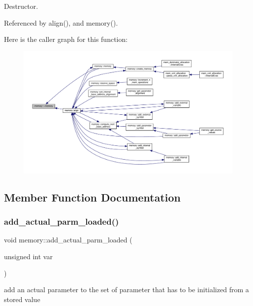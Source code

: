 Destructor. 



Referenced by align(), and memory().

Here is the caller graph for this function\+:
\nopagebreak
\begin{figure}[H]
\begin{center}
\leavevmode
\includegraphics[width=350pt]{d8/d99/classmemory_ae5893b724ce22f38b776558384f21680_icgraph}
\end{center}
\end{figure}


\subsection{Member Function Documentation}
\mbox{\label{classmemory_a3df806662ba923a3bf6d8608acae5048}} 
\subsubsection{\texorpdfstring{add\+\_\+actual\+\_\+parm\+\_\+loaded()}{add\_actual\_parm\_loaded()}}
{\footnotesize\ttfamily void memory\+::add\+\_\+actual\+\_\+parm\+\_\+loaded (\begin{DoxyParamCaption}\item[{unsigned int}]{var }\end{DoxyParamCaption})}



add an actual parameter to the set of parameter that has to be initialized from a stored value 



